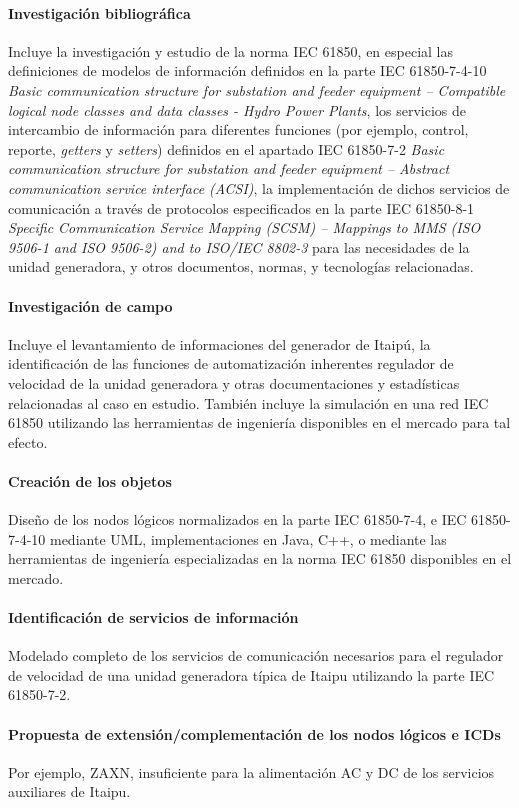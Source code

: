 \documentclass[conference,twocolumn]{IEEEtran}
\begin{document}
	\paragraph{Investigaci\'on bibliogr\'afica} 
		Incluye la investigaci\'on y estudio de la norma IEC 61850, en especial las definiciones de modelos de informaci\'on definidos en la parte IEC 61850-7-4-10 \emph{Basic communication structure for substation and feeder equipment – Compatible logical node classes and data classes - Hydro Power Plants}, los servicios de intercambio de informaci\'on para diferentes funciones (por ejemplo, control, reporte, \emph{getters} y \emph{setters}) definidos en el apartado IEC 61850-7-2 \emph{Basic communication structure for substation and feeder equipment – Abstract communication service interface (ACSI)}, la implementaci\'on de dichos servicios de comunicaci\'on a trav\'es de protocolos especificados en la parte IEC 61850-8-1 \emph{Specific Communication Service Mapping (SCSM) – Mappings to MMS (ISO 9506-1 and ISO 9506-2) and to ISO/IEC 8802-3} para las necesidades de la unidad generadora, y otros documentos, normas, y tecnolog\'ias relacionadas.
	\paragraph{Investigaci\'on de campo}
		Incluye el levantamiento de informaciones del generador de Itaip\'u, la identificaci\'on de las funciones de automatizaci\'on inherentes regulador de velocidad de la unidad generadora y otras documentaciones y estad\'isticas relacionadas al caso en estudio. Tambi\'en incluye la simulaci\'on en una red IEC 61850 utilizando las herramientas de ingenier\'ia disponibles en el mercado para tal efecto.
	\paragraph{Creaci\'on de los objetos}
		Dise\~no de los nodos l\'ogicos normalizados en la parte IEC 61850-7-4, e IEC 61850-7-4-10 mediante UML, implementaciones en Java, C++, o mediante las herramientas de ingenier\'ia especializadas en la norma IEC 61850 disponibles en el mercado.
	\paragraph{Identificaci\'on de servicios de informaci\'on}
		Modelado completo de los servicios de comunicaci\'on necesarios para el regulador de velocidad de una unidad generadora t\'ipica de Itaipu utilizando la parte IEC 61850-7-2.
	\paragraph{Propuesta de extensi\'on/complementaci\'on de los nodos l\'ogicos e ICDs}
		Por ejemplo, ZAXN, insuficiente para la alimentaci\'on AC y DC de los servicios auxiliares de Itaipu.
\end{document}

